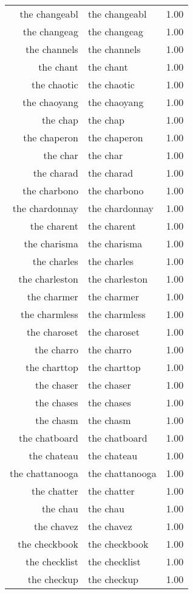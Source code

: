 \begin{table}[ht]
\begin{tabular}{rlr}
  the changeabl & the changeabl & 1.00 \\ 
  the changeag & the changeag & 1.00 \\ 
  the channels & the channels & 1.00 \\ 
  the chant & the chant & 1.00 \\ 
  the chaotic & the chaotic & 1.00 \\ 
  the chaoyang & the chaoyang & 1.00 \\ 
  the chap & the chap & 1.00 \\ 
  the chaperon & the chaperon & 1.00 \\ 
  the char & the char & 1.00 \\ 
  the charad & the charad & 1.00 \\ 
  the charbono & the charbono & 1.00 \\ 
  the chardonnay & the chardonnay & 1.00 \\ 
  the charent & the charent & 1.00 \\ 
  the charisma & the charisma & 1.00 \\ 
  the charles & the charles & 1.00 \\ 
  the charleston & the charleston & 1.00 \\ 
  the charmer & the charmer & 1.00 \\ 
  the charmless & the charmless & 1.00 \\ 
  the charoset & the charoset & 1.00 \\ 
  the charro & the charro & 1.00 \\ 
  the charttop & the charttop & 1.00 \\ 
  the chaser & the chaser & 1.00 \\ 
  the chases & the chases & 1.00 \\ 
  the chasm & the chasm & 1.00 \\ 
  the chatboard & the chatboard & 1.00 \\ 
  the chateau & the chateau & 1.00 \\ 
  the chattanooga & the chattanooga & 1.00 \\ 
  the chatter & the chatter & 1.00 \\ 
  the chau & the chau & 1.00 \\ 
  the chavez & the chavez & 1.00 \\ 
  the checkbook & the checkbook & 1.00 \\ 
  the checklist & the checklist & 1.00 \\ 
  the checkup & the checkup & 1.00 \\ 

\end{tabular}
\end{table}
